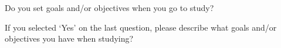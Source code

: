 \documentclass{ximera}
\begin{document}
\begin{question}
   Do you set goals and/or objectives when you go to study?

  \begin{multipleChoice}
  \end{multipleChoice}
\end{question}

\begin{question}
    If you selected `Yes' on the last question, please describe what goals and/or objectives you have when studying?\\
    \begin{freeResponse}
    \end{freeResponse}
\end{question}
\end{document}
